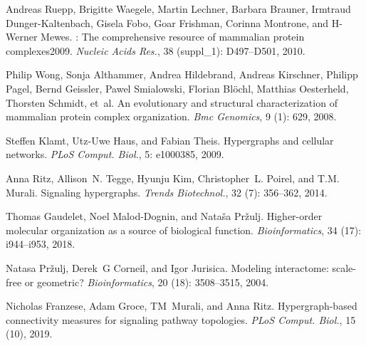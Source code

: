 Andreas Ruepp, Brigitte Waegele, Martin Lechner, Barbara Brauner, Irmtraud
{Dunger-Kaltenbach}, Gisela Fobo, Goar Frishman, Corinna Montrone, and
H-Werner Mewes.
: The comprehensive resource of mammalian protein
complexes\textemdash{}2009.
\newblock \emph{Nucleic Acids Res.}, 38 (suppl\_1):
D497--D501, 2010.

Philip Wong, Sonja Althammer, Andrea Hildebrand, Andreas Kirschner, Philipp
Pagel, Bernd Geissler, Pawel Smialowski, Florian Bl{\"o}chl, Matthias
Oesterheld, Thorsten Schmidt, et~al.
\newblock An evolutionary and structural characterization of mammalian protein
complex organization.
\newblock \emph{Bmc Genomics}, 9 (1): 629, 2008.

Steffen Klamt, Utz-Uwe Haus, and Fabian Theis.
\newblock Hypergraphs and cellular networks.
\newblock \emph{PLoS Comput. Biol.}, 5: e1000385, 2009.

Anna Ritz, Allison~N. Tegge, Hyunju Kim, Christopher~L. Poirel, and T.M.
Murali.
\newblock Signaling hypergraphs.
\newblock \emph{Trends Biotechnol.}, 32 (7): 356--362, 2014.

Thomas Gaudelet, Noel {Malod-Dognin}, and Nata{\v s}a Pr{\v z}ulj.
\newblock Higher-order molecular organization as a source of biological
function.
\newblock \emph{Bioinformatics}, 34 (17): i944--i953, 2018.

Natasa Pr{\v{z}}ulj, Derek~G Corneil, and Igor Jurisica.
\newblock Modeling interactome: scale-free or geometric?
\newblock \emph{Bioinformatics}, 20 (18): 3508--3515, 2004.

Nicholas Franzese, Adam Groce, TM~Murali, and Anna Ritz.
\newblock Hypergraph-based connectivity measures for signaling pathway
topologies.
\newblock \emph{PLoS Comput. Biol.}, 15 (10), 2019.

